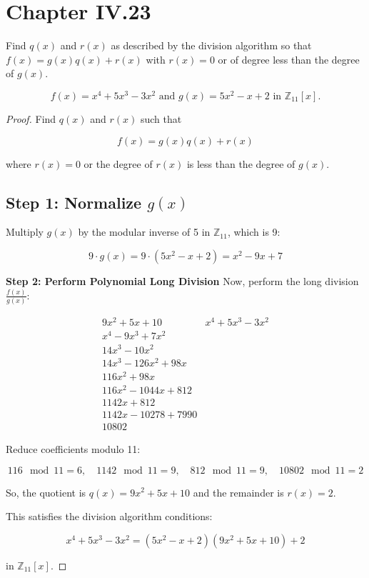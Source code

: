 \documentclass[12pt]{amsart}
\theoremstyle{definition}
\numberwithin{equation}{section}
\theoremstyle{plain}
\newcommand{\Z}{\mathbb{Z}}
\begin{document}
\section*{Chapter IV.23}
\begin{exercise}{4}
    Find $q(x)$ and $r (x)$ as described by the division algorithm so that $f (x) = g(x)q(x) + r (x)$ with $r (x) = 0$ or of degree less than the degree of $g(x)$.

    \[f (x) = x^4 + 5x^3 - 3x^2 \text{ and }g(x) = 5x^2 - x + 2\text{ in }\Z_{11}[x].\]

\begin{proof}
Find \( q(x) \) and \( r(x) \) such that

\[ f(x) = g(x)q(x) + r(x) \]

where \( r(x) = 0 \) or the degree of \( r(x) \) is less than the degree of \( g(x) \).

\subsection*{Step 1: Normalize \( g(x) \)}

Multiply \( g(x) \) by the modular inverse of 5 in \( \mathbb{Z}_{11} \), which is 9:

\[ 9 \cdot g(x) = 9 \cdot (5x^2 - x + 2) = x^2 - 9x + 7 \]

\textbf{Step 2: Perform Polynomial Long Division}
Now, perform the long division \( \frac{f(x)}{g(x)} \):

\[
\begin{array}{r|l}
9x^2 + 5x + 10 & x^4 + 5x^3 - 3x^2 \\
\hline
x^4 - 9x^3 + 7x^2 & \\
\hline
14x^3 - 10x^2 & \\
14x^3 - 126x^2 + 98x & \\
\hline
116x^2 + 98x & \\
116x^2 - 1044x + 812 & \\
\hline
1142x + 812 & \\
1142x - 10278 + 7990 & \\
\hline
10802 &
\end{array}
\]

Reduce coefficients modulo 11:

\[ 116 \mod 11 = 6, \quad 1142 \mod 11 = 9, \quad 812 \mod 11 = 9, \quad 10802 \mod 11 = 2 \]

So, the quotient is \( q(x) = 9x^2 + 5x + 10 \) and the remainder is \( r(x) = 2 \).

This satisfies the division algorithm conditions:

\[ x^4 + 5x^3 - 3x^2 = (5x^2 - x + 2)(9x^2 + 5x + 10) + 2 \]

in \( \mathbb{Z}_{11}[x] \).
\end{proof}
\end{exercise}
\end{document}
